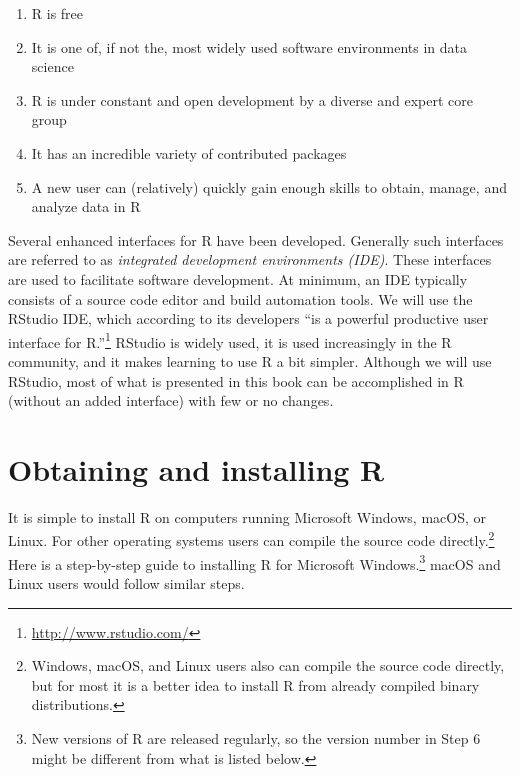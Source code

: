 \documentclass[
]{krantz}
\providecommand{\tightlist}{%
  \setlength{\itemsep}{0pt}\setlength{\parskip}{0pt}}
\begin{document}
\begin{enumerate}
\def\labelenumi{\arabic{enumi}.}
\tightlist
\item
  R is free
\item
  It is one of, if not the, most widely used software environments in data science
\item
  R is under constant and open development by a diverse and expert core group
\item
  It has an incredible variety of contributed packages
\item
  A new user can (relatively) quickly gain enough skills to obtain, manage, and analyze data in R
\end{enumerate}

Several enhanced interfaces for R have been developed. Generally such interfaces are referred to as \emph{integrated development environments (IDE)}. These interfaces are used to facilitate software development. At minimum, an IDE typically consists of a source code editor and build automation tools. We will use the RStudio IDE, which according to its developers ``is a powerful productive user interface for R.''\footnote{\url{http://www.rstudio.com/}} RStudio is widely used, it is used increasingly in the R community, and it makes learning to use R a bit simpler. Although we will use RStudio, most of what is presented in this book can be accomplished in R (without an added interface) with few or no changes.

\hypertarget{obtaining-and-installing-r}{%
\section{Obtaining and installing R}\label{obtaining-and-installing-r}}

It is simple to install R on computers running Microsoft Windows, macOS, or Linux. For other operating systems users can compile the source code directly.\footnote{Windows, macOS, and Linux users also can compile the source code directly, but for most it is a better idea to install R from already compiled binary distributions.}
Here is a step-by-step guide to installing R for Microsoft Windows.\footnote{New versions of R are released regularly, so the version number in Step 6 might be different from what is listed below.} macOS and Linux users would follow similar steps.
\end{document}
